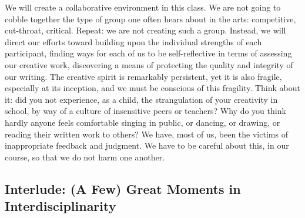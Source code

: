 \documentclass[10pt,DIV09,letterpaper,oneside,headsepline]{scrreprt}
\begin{document}
We will create a collaborative environment in this class. We are not going to cobble together the type of group one often hears about in the arts: competitive, cut-throat, critical. Repeat: we are not creating such a group. Instead, we will direct our efforts toward building upon the individual strengths of each participant, finding ways for each of us to be self-reflective in terms of assessing our creative work, discovering a means of protecting the quality and integrity of our writing. The creative spirit is remarkably persistent, yet it is also fragile, especially at its inception, and
we must be conscious of this fragility. Think about it: did you not experience, as a child, the strangulation of your creativity in school, by way of a culture of insensitive peers or teachers? Why do you think hardly anyone feels comfortable singing in public, or dancing, or drawing, or reading their written work to others? We have, most of us, been the victims of inappropriate feedback and judgment. We have to be careful about this, in our course, so that we do not harm one another.

\subsection{Interlude: (A Few) Great Moments in Interdisciplinarity}
\end{document}

